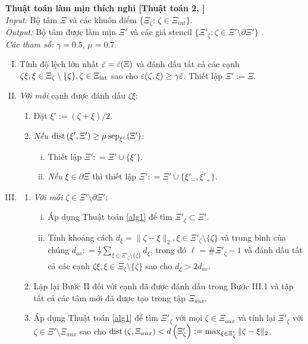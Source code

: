 \begin{algorithm}\label{alg1Refi}\rm {\bf Thuật toán làm mịn thích nghi  [Thuật toán 2, \cite{DavyOanh11}]} \\
\emph{Input:} Bộ tâm $\Xi$ và các khuôn điểm $\{\Xi_\zeta:\,\zeta\in\Xi_{int}\}$. \\
\emph{Output:} Bộ tâm được làm mịn $\Xi'$ và các giá stencil $\{ \Xi' _ { \zeta }: \zeta \in \Xi' \setminus \partial \Xi' \}$ . \\
\emph{Các tham số:}   $\gamma = 0.5$, $\mu = 0.7$. 
\begin{enumerate}[I.] 
\item\label{1step1} Tính độ lệch lớn nhất  $\bar{\varepsilon}=\bar{\varepsilon}(\Xi)$ và đánh dấu tất cả các cạnh $\zeta\xi, \xi \in \Xi_{\zeta}\setminus \{\zeta\}, \zeta \in \Xi_{\rm int}$ sao cho $\varepsilon(\zeta, \xi) \ge \gamma\bar{\varepsilon}$. Thiết lập  $\Xi':=\Xi$.
\item \label{1step2} \emph{Với mỗi} cạnh được đánh dấu $\zeta\xi$: 
\begin{enumerate}[1.]
\item Đặt $\xi':=(\zeta+\xi)/2$.
\item \emph{Nếu} $\operatorname{dist}\left( \xi' , \Xi' \right) \ge \mu \operatorname{sep} _ { \xi' } \left( \Xi' \right)$:
\begin{enumerate}[i.] 
\item Thiết lập  $\Xi': = \Xi' \cup \{ \xi'\}$.
\item \emph{Nếu} $\xi \in \partial \Xi$ thì thiết lập $\Xi': = \Xi' \cup \{ \xi' _ { - }, \xi' _ { + }\}$.
\end{enumerate}
\end{enumerate}
\item 
\begin{enumerate}[1.]
\item \emph{Với mỗi} $\zeta \in \Xi' \setminus \partial \Xi'$:
\begin{enumerate}[i.] 
\item Áp dụng Thuật toán \ref{alg1} để tìm $\Xi' _ { \zeta } \subset \Xi'$. 
\item Tính khoảng cách $d _ { \xi } = \| \zeta - \xi \| _ { 2 } , \xi \in \Xi' _ { \zeta } \setminus \{ \zeta \}$ và trung bình của chúng 
$d _ { a v } : = \frac { 1 } { \ell } \sum _ { \xi \in \Xi' _ { \zeta } \setminus \{ \zeta \} } d _ { \xi }$, trong đó $\ell = \# \Xi' _ { \zeta } - 1$ và 
đánh dấu tất cả các cạnh $\zeta \xi , \xi \in \Xi _ { \zeta } \setminus \{ \zeta \}$ sao cho $d _ { \xi } > 2 d _ { a v }$.
\end{enumerate}
\item Lặp lại Bước II đối với cạnh đã được đánh dấu trong Bước III.1 và tập tất cả các tâm mới đã được tạo trong tập $\Xi_{aux}$.
\item Áp dụng Thuật toán \ref{alg1} để tìm $\Xi' _ { \zeta }$ với mọi $\zeta \in \Xi_{aux}$ và tính lại $\Xi' _ { \zeta }$ với $\zeta \in \Xi' \setminus \Xi _ { a u x }$ sao cho $\operatorname{dist}  \left( \zeta , \Xi _ { a u x } \right) < d \left( \Xi' _ { \zeta }\right): = \max _ { \xi \in \Xi'_ { \zeta } } \| \zeta - \xi \| _ { 2 }$. 
\end{enumerate}
\end{enumerate}
\end{algorithm}
%  